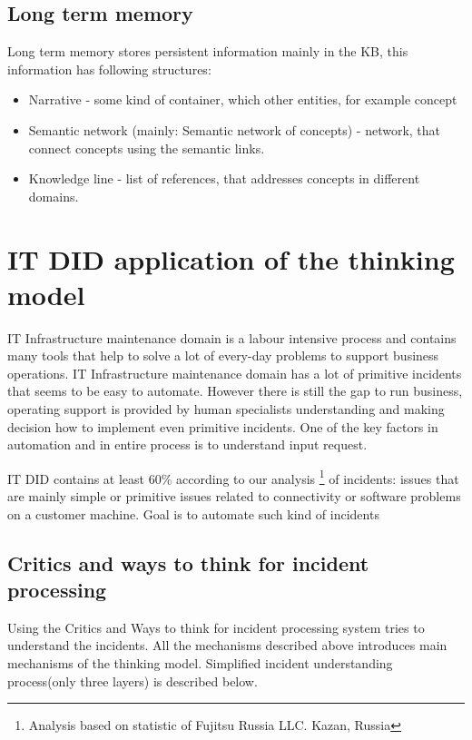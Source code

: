\documentclass[conference]{IEEEtran}
\begin{document}
\subsection{Long term memory}
Long term memory stores persistent information mainly in the KB, this information has following structures:

\begin{itemize}
  \item Narrative - some kind of container, which other entities, for example concept
  \item Semantic network (mainly: Semantic network of concepts) - network, that connect concepts using the semantic links.
  \item Knowledge line - list of references, that addresses concepts in different domains.
\end{itemize}

\section{IT DID application of the thinking model}

IT Infrastructure maintenance domain is a labour intensive process and contains many tools that help to solve a lot of every-day problems to support business operations. IT Infrastructure maintenance domain has a lot of primitive incidents that seems to be easy to automate. However there is still the gap to run business, operating support is provided by human specialists understanding and making decision how to implement even primitive incidents. One of the key factors in automation and in entire process is to understand input request.

IT DID contains at least 60\% according to our analysis \footnote{Analysis based on statistic of Fujitsu Russia LLC. Kazan, Russia } of incidents: issues that are mainly simple or primitive issues related to connectivity or software problems on a customer machine. Goal is to automate such kind of incidents

\subsection{Critics and ways to think for incident processing}
Using the Critics and Ways to think for incident processing system tries to understand the incidents.
All the mechanisms described above introduces main mechanisms of the thinking model. Simplified incident understanding process(only three layers) is described below.
\end{document}
